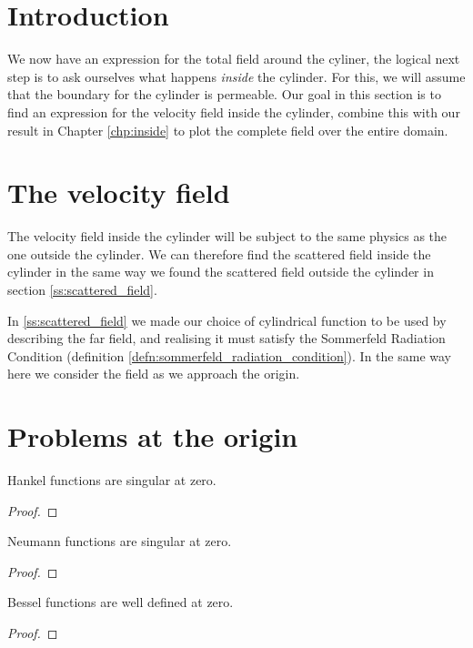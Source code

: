 %
\section{Introduction}
We now have an expression for the total field around the cyliner, the logical next step is to ask ourselves what happens \emph{inside} the cylinder. For this, we will assume that the boundary for the cylinder is permeable. Our goal in this section is to find an expression for the velocity field inside the cylinder, combine this with our result in Chapter \ref{chp:inside} to plot the complete field over the entire domain. \par
%
\section{The velocity field}
%
The velocity field inside the cylinder will be subject to the same physics as the one outside the cylinder. We can therefore find the scattered field inside the cylinder in the same way we found the scattered field outside the cylinder in section \ref{ss:scattered_field}. \par
%
In \ref{ss:scattered_field} we made our choice of cylindrical function to be used by describing the far field, and realising it must satisfy the Sommerfeld Radiation Condition (definition \ref{defn:sommerfeld_radiation_condition}). In the same way here we consider the field as we approach the origin.
%
\section{Problems at the origin}
%
  \begin{propn}
    Hankel functions are singular at zero.
  \end{propn}
  \begin{proof}

  \end{proof}
%
  \begin{propn}
    Neumann functions are singular at zero.
  \end{propn}
  \begin{proof}

  \end{proof}
%
  \begin{propn}
    Bessel functions are well defined at zero.
  \end{propn}
  \begin{proof}

  \end{proof}
%
